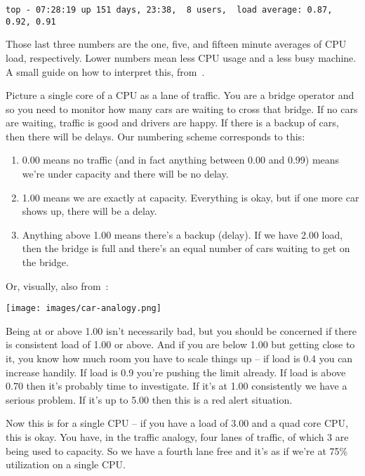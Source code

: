 \begin{verbatim}
top - 07:28:19 up 151 days, 23:38,  8 users,  load average: 0.87, 0.92, 0.91
\end{verbatim}

Those last three numbers are the one, five, and fifteen minute averages of CPU load, respectively. Lower numbers mean less CPU usage and a less busy machine. A small guide on how to interpret this, from~\cite{scout}.

Picture a single core of a CPU as a lane of traffic. You are a bridge operator and so you need to monitor how many cars are waiting to cross that bridge. If no cars are waiting, traffic is good and drivers are happy. If there is a backup of cars, then there will be delays. Our numbering scheme corresponds to this:

\begin{enumerate}
	\item 0.00 means no traffic (and in fact anything between 0.00 and 0.99) means we're under capacity and there will be no delay.
	\item 1.00 means we are exactly at capacity. Everything is okay, but if one more car shows up, there will be a delay.
	\item Anything above 1.00 means there's a backup (delay). If we have 2.00 load, then the bridge is full and there's an equal number of cars waiting to get on the bridge. 
\end{enumerate}

Or, visually, also from~\cite{scout}:

\begin{center}
	\texttt{[image: images/car-analogy.png]}
\end{center}

Being at or above 1.00 isn't necessarily bad, but you should be concerned if there is consistent load of 1.00 or above. And if you are below 1.00 but getting close to it, you know how much room you have to scale things up -- if load is 0.4 you can increase handily. If load is 0.9 you're pushing the limit already. If load is above 0.70 then it's probably time to investigate. If it's at 1.00 consistently we have a serious problem. If it's up to 5.00 then this is a red alert situation.

Now this is for a single CPU -- if you have a load of 3.00 and a quad core CPU, this is okay. You have, in the traffic analogy, four lanes of traffic, of which 3 are being used to capacity. So we have a fourth lane free and it's as if we're at 75\% utilization on a single CPU.


